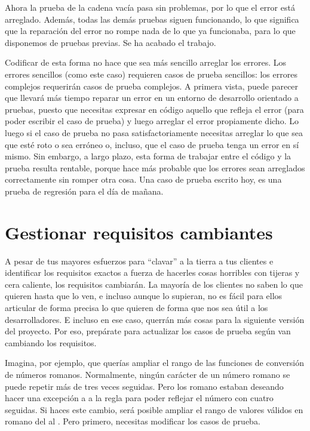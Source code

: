 Ahora la prueba de la cadena vacía pasa sin problemas, por lo que el error está arreglado.
Además, todas las demás pruebas siguen funcionando, lo que significa que la reparación del error no rompe nada de lo que ya funcionaba, para lo que disponemos de pruebas previas. Se ha acabado el trabajo.

Codificar de esta forma no hace que sea más sencillo arreglar los errores. Los errores sencillos (como este caso) requieren casos de prueba sencillos: los errores complejos requerirán casos de prueba complejos. A primera vista, puede parecer que llevará más tiempo reparar un error en un entorno de desarrollo orientado a pruebas, puesto que necesitas expresar en código aquello que refleja el error (para poder escribir el caso de prueba) y luego arreglar el error propiamente dicho. Lo luego si el caso de prueba no pasa satisfactoriamente necesitas arreglar lo que sea que esté roto o sea erróneo o, incluso, que el caso de prueba tenga un error en sí mismo. Sin embargo, a largo plazo, esta forma de trabajar entre el código y la prueba resulta rentable, porque hace más probable que los errores sean arreglados correctamente sin romper otra cosa. Una caso de prueba escrito hoy, es una prueba de regresión para el día de mañana.

\section{Gestionar requisitos cambiantes}

A pesar de tus mayores esfuerzos para ``clavar'' a la tierra a tus clientes e identificar los requisitos exactos a fuerza de hacerles cosas horribles con tijeras y cera caliente, los requisitos cambiarán. La mayoría de los clientes no saben lo que quieren hasta que lo ven, e incluso aunque lo supieran, no es fácil para ellos articular de forma precisa lo que quieren de forma que nos sea útil a los desarrolladores. E incluso en ese caso, querrán más cosas para la siguiente versión del proyecto. Por eso, prepárate para actualizar los casos de prueba según van cambiando los requisitos.

Imagina, por ejemplo, que querías ampliar el rango de las funciones de conversión de números romanos. Normalmente, ningún carácter de un número romano se puede repetir más de tres veces seguidas. Pero los romano estaban deseando hacer una excepción a a la regla para poder reflejar el número  con cuatro  seguidas. Si haces este cambio, será posible ampliar el rango de valores válidos en romano del  al . Pero primero, necesitas modificar los casos de prueba.

